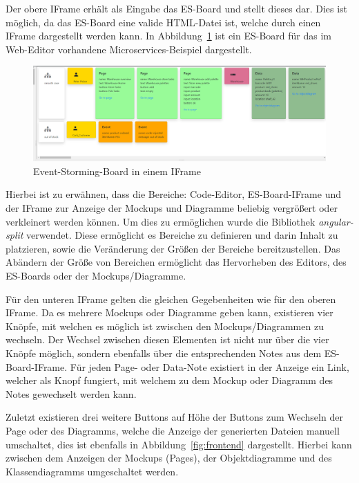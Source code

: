 Der obere IFrame erhält als Eingabe das \ac{ES}-Board und stellt dieses dar.
Dies ist möglich, da das \ac{ES}-Board eine valide HTML-Datei ist, welche durch einen IFrame dargestellt werden kann.
In Abbildung~\ref{fig:esBoard} ist ein \ac{ES}-Board für das im Web-Editor vorhandene Microservices-Beispiel dargestellt.

\begin{figure}[h]
    \centering
    \includegraphics[width=1.0\textwidth]{images/3.2/board}
    \caption{Event-Storming-Board in einem IFrame}
    \label{fig:esBoard}
\end{figure}

Hierbei ist zu erwähnen, dass die Bereiche: Code-Editor, \ac{ES}-Board-IFrame und der IFrame zur Anzeige der Mockups und Diagramme beliebig vergrößert oder verkleinert werden können.
Um dies zu ermöglichen wurde die Bibliothek \textit{angular-split} verwendet.
Diese ermöglicht es Bereiche zu definieren und darin Inhalt zu platzieren, sowie die Veränderung der Größen der Bereiche bereitzustellen\cite*{angular-split}.
Das Abändern der Größe von Bereichen ermöglicht das Hervorheben des Editors, des \ac{ES}-Boards oder der Mockups/Diagramme.

Für den unteren IFrame gelten die gleichen Gegebenheiten wie für den oberen IFrame.
Da es mehrere Mockups oder Diagramme geben kann, existieren vier Knöpfe, mit welchen es möglich ist zwischen den Mockups/Diagrammen zu wechseln.
Der Wechsel zwischen diesen Elementen ist nicht nur über die vier Knöpfe möglich, sondern ebenfalls über die entsprechenden Notes aus dem \ac{ES}-Board-IFrame.
Für jeden Page- oder Data-Note existiert in der Anzeige ein Link, welcher als Knopf fungiert, mit welchem zu dem Mockup oder Diagramm des Notes gewechselt werden kann.

Zuletzt existieren drei weitere Buttons auf Höhe der Buttons zum Wechseln der Page oder des Diagramms, welche die Anzeige der generierten Dateien manuell umschaltet,
dies ist ebenfalls in Abbildung~\ref{fig:frontend} dargestellt.
Hierbei kann zwischen dem Anzeigen der Mockups (Pages), der Objektdiagramme und des Klassendiagramms umgeschaltet werden.

